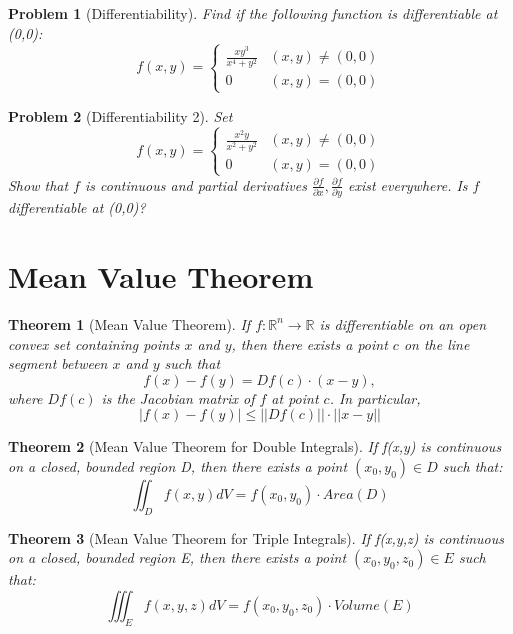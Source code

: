 \documentclass{article}
\newtheorem{theorem}{Theorem}
\newtheorem{problem}{Problem}
\begin{document}
\begin{problem}[Differentiability]
    Find if the following function is differentiable at (0,0):
    \[f(x,y) = \begin{cases} \frac{xy^3}{x^4 + y^2} & (x,y) \neq (0,0) \\ 0 & (x,y) = (0,0) \end{cases}\]
\end{problem}
\begin{problem}[Differentiability 2]
    Set
    \[f(x,y) = \begin{cases} \frac{x^2y}{x^2 + y^2} & (x,y) \neq (0,0) \\ 0 & (x,y) = (0,0) \end{cases}\]
    Show that \(f\) is continuous and partial derivatives \(\frac{\partial f}{\partial x}, \frac{\partial f}{\partial y}\) exist everywhere. Is \(f\) differentiable at (0,0)?
\end{problem}

\section{Mean Value Theorem}
\begin{theorem}[Mean Value Theorem]
    If \(f : \mathbb{R}^n \to \mathbb{R}\) is differentiable on an open convex set containing points \(x\) and \(y\), then there exists a point \(c\) on the line segment between \(x\) and \(y\) such that
    \[f(x) - f(y) = Df(c) \cdot (x - y),\]
    where \(Df(c)\) is the Jacobian matrix of \(f\) at point \(c\). In particular,
    \[|f(x) - f(y)| \leq ||Df(c)|| \cdot ||x-y|| \]
\end{theorem}
\begin{theorem}[Mean Value Theorem for Double Integrals]
    If f(x,y) is continuous on a closed, bounded region D, then there exists a point \((x_0,y_0) \in D\) such that:
    \[\iint_D f(x,y) dV = f(x_0,y_0) \cdot Area(D)\]
\end{theorem}
\begin{theorem}[Mean Value Theorem for Triple Integrals]
    If f(x,y,z) is continuous on a closed, bounded region E, then there exists a point \((x_0,y_0,z_0) \in E\) such that:
    \[\iiint_E f(x,y,z) dV = f(x_0,y_0,z_0) \cdot Volume(E)\]
\end{theorem}
\end{document}

